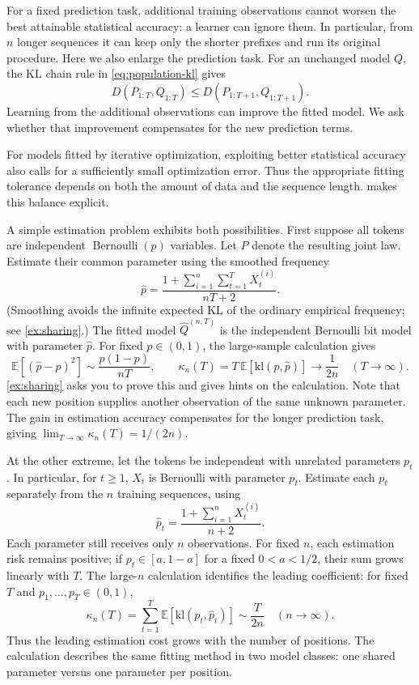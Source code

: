 \documentclass[11pt,twoside]{article}
\newcommand{\E}{\mathbb E}
\newcommand{\KL}{D}
\newcommand{\kl}{\mathrm{kl}}
\theoremstyle{definition}
\theoremstyle{remark}
\begin{document}
For a fixed prediction task, additional training observations cannot
worsen the best attainable statistical accuracy: a learner can ignore
them. In particular, from \(n\) longer sequences it can keep only the
shorter prefixes and run its original procedure. Here we also enlarge
the prediction task. For an unchanged model \(Q\), the KL chain rule
in \cref{eq:population-kl} gives
\[
 \KL(P_{1:T}, Q_{1:T})
 \le \KL(P_{1:T+1}, Q_{1:T+1}).
\]
Learning from the additional observations can improve the fitted
model. We ask whether that improvement compensates for the new
prediction terms.

For models fitted by iterative optimization, exploiting better
statistical accuracy also calls for a sufficiently small optimization
error. Thus the appropriate fitting tolerance depends on both the
amount of data and the sequence length.
 makes this balance explicit.

A simple estimation problem exhibits both possibilities. First suppose
all tokens are independent \(\operatorname{Bernoulli}(p)\) variables.
Let $P$ denote the resulting joint law.
Estimate their common parameter using the smoothed frequency
\[
 \widehat p=
 \frac{1+\sum_{i=1}^n\sum_{t=1}^T X_t^{(i)}}{nT+2}.
\]
(Smoothing avoids the infinite expected KL of the
ordinary empirical frequency; see \cref{ex:sharing}.)
The fitted model $\widehat Q^{(n,T)}$ is
the independent Bernoulli bit model with parameter \(\widehat p\).
For fixed \(p\in(0,1)\), the large-sample calculation gives
\begin{equation}
 \E[(\widehat p-p)^2]\sim\frac{p(1-p)}{nT},
 \qquad
 \kappa_n(T)=T\,\E[\kl(p,\widehat p)]
 \longrightarrow\frac1{2n}
 \quad(T\to\infty).
 \label{eq:shared-bernoulli}
\end{equation}
\cref{ex:sharing} asks you to prove this and gives hints on the calculation.
Note that each new
position supplies another observation of the same unknown parameter.
The gain in estimation accuracy compensates for the longer prediction
task, giving $\lim_{T\to\infty}\kappa_n(T)=1/(2n)$.

At the other extreme, let the tokens be independent with unrelated
parameters \(p_t\). In particular, for $t\ge 1$,
$X_t$ is Bernoulli with parameter $p_t$.
Estimate each \(p_t\) separately from the \(n\)
training sequences, using
\[
 \widehat p_t=\frac{1+\sum_{i=1}^n X_t^{(i)}}{n+2}.
\]
Each parameter still receives only \(n\) observations. For fixed \(n\),
each estimation risk remains positive; if \(p_t\in[a,1-a]\) for a
fixed \(0<a<1/2\), their sum grows linearly with \(T\).
The large-\(n\) calculation identifies the leading coefficient:
for fixed \(T\) and \(p_1,\ldots,p_T\in(0,1)\),
\begin{equation}
 \kappa_n(T)=\sum_{t=1}^T\E[\kl(p_t,\widehat p_t)]
 \sim\frac{T}{2n}
 \quad(n\to\infty).
 \label{eq:unshared-bernoulli}
\end{equation}
Thus the leading estimation cost grows with the number of positions.
The calculation describes the same fitting method in two model
classes: one shared parameter versus one parameter per position.
\end{document}
